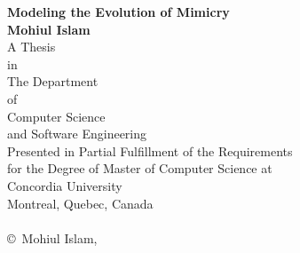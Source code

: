 \begin{titlepage}
\begin{center}

\Large \textbf{Modeling the Evolution of Mimicry}\\[1.5cm]
\large \textbf{Mohiul Islam}\\[2.5cm]
\large A Thesis\\ in\\ The Department\\ of\\ Computer Science\\ and Software Engineering\\[2.5cm]
\large Presented in Partial Fulfillment of the Requirements\\ for the Degree of Master of Computer Science at\\ Concordia University\\ Montreal, Quebec, Canada\\[1.5cm]
\large \monthname \ \the \year \\[2cm]
\vfill
\large \copyright \ Mohiul Islam, \the \year
\end{center}
\end{titlepage}
